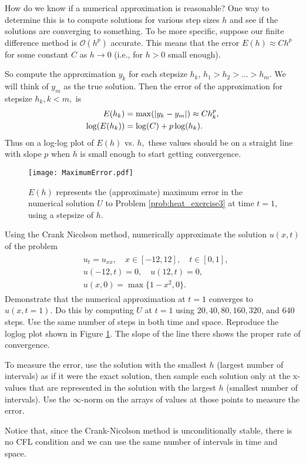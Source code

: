 How do we know if a numerical approximation is reasonable?
One way to determine this is to compute solutions for various step sizes $h$ and see if the solutions are converging to something.
To be more specific, suppose our finite difference method is $\mathcal{O}(h^p)$ accurate.
This means that the error $E(h) \approx Ch^p$ for some constant $C$ as $h \to 0$ (i.e., for $h>0$ small enough).

So compute the approximation $y_k$ for each stepsize $h_k$, $h_1 > h_2> \ldots>h_m.$
We will think of $y_m$ as the true solution.
Then the error of the approximation for stepsize $h_k, k < m,$ is
\begin{align*}
	E(h_k) &= \max( \left\lvert y_k - y_m\right\rvert) \approx C h_k^p ,\\
	\log(E(h_k)) &= \log(C) + p \log(h_k).
\end{align*}
Thus on a log-log plot of $E(h)$ vs. $h,$ these values should be on a straight line with slope $p$ when $h$ is small enough to start getting convergence.

\begin{figure}
\centering
\texttt{[image: MaximumError.pdf]}
\caption{$E(h)$ represents the (approximate) maximum error in the numerical solution $U$ to Problem \ref{prob:heat_exercise3} at time $t=1$, using a stepsize of $h$.}
\label{fig:heatexercise3}
\end{figure}

\begin{problem}
\label{prob:heat_exercise3}
Using the Crank Nicolson method, numerically approximate the solution $u(x,t)$ of the problem
\begin{align}
	\begin{split}
	&{ } u_t = u_{xx}, \quad x \in [-12,12],\quad t \in [0,1],\\
	&{ } u(-12,t) = 0,\quad u(12,t) = 0,\\
	&{ } u(x,0) = \max\{1 - x^2,0\}.
	\end{split}
\end{align}
Demonstrate that the numerical approximation at $t = 1$ converges to  $u(x,t=1)$.
Do this by computing $U$ at $t=1$ using $20,40,80,160,320$, and $640$ steps.
Use the same number of steps in both time and space.
Reproduce the loglog plot shown in Figure \ref{fig:heatexercise3}.
The slope of the line there shows the proper rate of convergence.

To measure the error, use the solution with the smallest $h$ (largest number of intervals) as if it were the exact solution, then sample each solution only at the x-values that are represented in the solution with the largest $h$ (smallest number of intervals).
Use the $\infty$-norm on the arrays of values at those points to measure the error.

Notice that, since the Crank-Nicolson method is unconditionally stable, there is no CFL condition and we can use the same number of intervals in time and space.
\end{problem}
